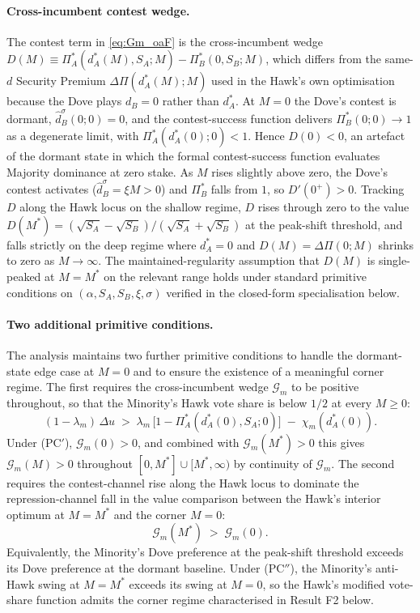 \documentclass[11pt,twoside]{extarticle}
\begin{document}
\paragraph{Cross-incumbent contest wedge.} The contest term in \autoref{eq:Gm_oaF} is the cross-incumbent wedge
$D(M)\equiv\Pi_A^{*}(d_A^{*}(M),S_A;M)-\Pi_B^{*}(0,S_B;M)$,
which differs from the same-$d$ Security Premium $\Delta\Pi(d_A^{*}(M);M)$ used in the Hawk's own optimisation because the Dove plays $d_B=0$ rather than $d_A^{*}$. At $M=0$ the Dove's contest is dormant, $\hat d^\sigma_B(0;0)=0$, and the contest-success function delivers $\Pi_B^{*}(0;0)\to 1$ as a degenerate limit, with $\Pi_A^{*}(d_A^{*}(0);0)<1$. Hence $D(0)<0$, an artefact of the dormant state in which the formal contest-success function evaluates Majority dominance at zero stake. As $M$ rises slightly above zero, the Dove's contest activates ($\hat d^\sigma_B=\xi M>0$) and $\Pi_B^{*}$ falls from $1$, so $D'(0^+)>0$. Tracking $D$ along the Hawk locus on the shallow regime, $D$ rises through zero to the value $D(M^{*})=(\sqrt{S_A}-\sqrt{S_B})/(\sqrt{S_A}+\sqrt{S_B})$ at the peak-shift threshold, and falls strictly on the deep regime where $d_A^{*}=0$ and $D(M)=\Delta\Pi(0;M)$ shrinks to zero as $M\to\infty$. The maintained-regularity assumption that $D(M)$ is single-peaked at $M=M^{*}$ on the relevant range holds under standard primitive conditions on $(\alpha,S_A,S_B,\xi,\sigma)$ verified in the closed-form specialisation below.

\paragraph{Two additional primitive conditions.} The analysis maintains two further primitive conditions to handle the dormant-state edge case at $M=0$ and to ensure the existence of a meaningful corner regime. The first requires the cross-incumbent wedge $\mathcal G_m$ to be positive throughout, so that the Minority's Hawk vote share is below $1/2$ at every $M\ge 0$:
\begin{equation}\label{eq:PCprime_oaF}
    (1-\lambda_m)\,\Delta u\;>\;\lambda_m\,\big[1-\Pi_A^{*}(d_A^{*}(0),S_A;0)\big]\;-\;\chi_m(d_A^{*}(0)).\tag{PC$'$}
\end{equation}
Under (PC$'$), $\mathcal G_m(0)>0$, and combined with $\mathcal G_m(M^{*})>0$ this gives $\mathcal G_m(M)>0$ throughout $[0,M^{*}]\cup[M^{*},\infty)$ by continuity of $\mathcal G_m$. The second requires the contest-channel rise along the Hawk locus to dominate the repression-channel fall in the value comparison between the Hawk's interior optimum at $M=M^{*}$ and the corner $M=0$:
\begin{equation}\label{eq:PCdoubleprime_oaF}
    \mathcal G_m(M^{*})\;>\;\mathcal G_m(0).\tag{PC$''$}
\end{equation}
Equivalently, the Minority's Dove preference at the peak-shift threshold exceeds its Dove preference at the dormant baseline. Under (PC$''$), the Minority's anti-Hawk swing at $M=M^{*}$ exceeds its swing at $M=0$, so the Hawk's modified vote-share function admits the corner regime characterised in Result F2 below.
\end{document}
